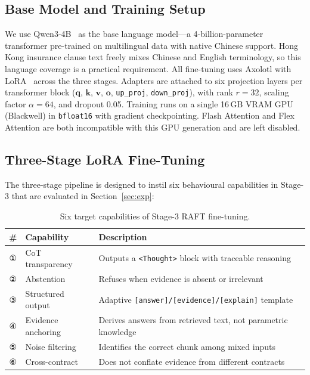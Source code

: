 \documentclass[10pt,conference]{IEEEtran}
\begin{document}
\subsection{Base Model and Training Setup}

We use Qwen3-4B~\cite{qwen3} as the base language model---a 4-billion-parameter
transformer pre-trained on multilingual data with native Chinese support.
Hong Kong insurance clause text freely mixes Chinese and English terminology,
so this language coverage is a practical requirement.
All fine-tuning uses Axolotl with LoRA~\cite{hu2022lora} across the three
stages.
Adapters are attached to six projection layers per transformer block
($\mathbf{q}$, $\mathbf{k}$, $\mathbf{v}$, $\mathbf{o}$, \texttt{up\_proj},
\texttt{down\_proj}), with rank $r{=}32$, scaling factor $\alpha{=}64$, and
dropout 0.05.
Training runs on a single 16\,GB VRAM GPU (Blackwell) in \texttt{bfloat16}
with gradient checkpointing.
Flash Attention and Flex Attention are both incompatible with this GPU
generation and are left disabled.

\subsection{Three-Stage LoRA Fine-Tuning}

The three-stage pipeline is designed to instil six behavioural capabilities in
Stage-3 that are evaluated in Section~\ref{sec:exp}:

\begin{table}[htbp]
\centering
\caption{Six target capabilities of Stage-3 RAFT fine-tuning.}
\label{tab:capabilities}
\small
\begin{tabular}{@{}clp{5cm}@{}}
\toprule
\# & Capability & Description \\
\midrule
① & CoT transparency  & Outputs a \texttt{<Thought>} block with traceable reasoning \\
② & Abstention        & Refuses when evidence is absent or irrelevant \\
③ & Structured output & Adaptive \texttt{[answer]/[evidence]/[explain]} template \\
④ & Evidence anchoring & Derives answers from retrieved text, not parametric knowledge \\
⑤ & Noise filtering   & Identifies the correct chunk among mixed inputs \\
⑥ & Cross-contract    & Does not conflate evidence from different contracts \\
\bottomrule
\end{tabular}
\end{table}
\end{document}
